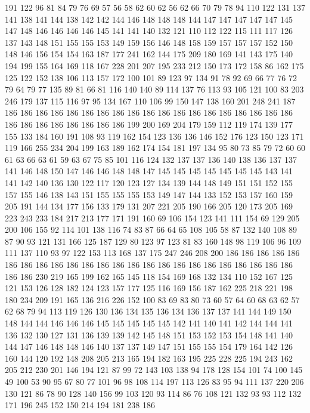 191 122 96 81 84 79 76 69 57 56 58 62 60 62 56 62 66 70 79 78
94 110 122 131 137 141 138 141 144 138 142 142 144 146 148 148 148 144 147 147
147 147 147 145 147 148 146 146 146 146 145 141 141 140 132 121 110 112 122 115
111 117 126 137 143 148 151 155 155 153 149 159 156 146 148 158 159 157 157 157
152 150 148 146 156 154 154 163 187 177 241 162 144 175 209 180 169 141 143 175
140 194 199 155 164 169 118 167 228 201 207 195 233 212 150 173 172 158 86 162
175 125 122 152 138 106 113 157 172 100 101 89 123 97 134 91 78 92 69 66
77 76 72 79 64 79 77 135 89 81 66 81 116 140 140 89 114 137 76 113
93 105 121 100 83 203 246 179 137 115 116 97 95 134 167 110 106 99 150 147
138 160 201 248 241 187 186 186 186 186 186 186 186 186 186 186 186 186 186 186
186 186 186 186 186 186 186 186 186 186 186 186 186 199 200 169 204 179 159 112
119 174 139 177 155 133 184 160 191 108 93 119 162 154 123 136 136 146 152 176
123 150 123 171 119 166 255 234 204 199 163 189 162 174 154 181 197 134 95 80
73 85 79 72 60 60 61 63 66 63 61 59 63 67 75 85 101 116 124 132
137 137 136 140 138 136 137 137 141 146 148 150 147 146 146 148 148 147 145 145
145 145 145 145 145 143 141 141 142 140 136 130 122 117 120 123 127 134 139 144
148 149 151 151 152 155 157 155 146 138 143 151 155 155 155 153 149 147 144 133
152 153 157 160 159 205 191 144 134 177 156 133 179 131 207 221 205 190 166 205
120 173 205 169 223 243 233 184 217 213 177 171 191 160 69 106 154 123 141 111
154 69 129 205 200 106 155 92 114 101 138 116 74 83 87 66 64 65 108 105
58 87 132 140 108 89 87 90 93 121 131 166 125 187 129 80 123 97 123 81
83 160 148 98 119 106 96 109 111 137 110 93 97 122 153 113 168 137 175 247
246 208 200 186 186 186 186 186 186 186 186 186 186 186 186 186 186 186 186 186
186 186 186 186 186 186 186 186 186 230 219 165 199 162 165 145 118 154 169 168
132 134 110 152 167 125 121 153 126 128 182 124 123 157 177 125 116 169 156 187
162 225 218 221 198 180 234 209 191 165 136 216 226 152 100 83 69 83 80 73
60 57 64 60 68 63 62 57 62 68 79 94 113 119 126 130 136 134 135 136
134 136 137 137 141 144 149 150 148 144 144 146 146 146 145 145 145 145 145 142
141 140 141 142 144 144 141 136 132 130 127 131 136 139 139 142 145 148 151 153
152 153 154 148 141 140 144 147 146 148 148 146 140 137 137 149 147 151 155 155
154 179 164 142 126 160 144 120 192 148 208 205 213 165 194 182 163 195 225 228
225 194 243 162 205 212 230 201 146 194 121 87 99 72 143 103 138 94 178 128
154 101 74 100 145 49 100 53 90 95 67 80 77 101 96 98 108 114 197 113
126 83 95 94 111 137 220 206 130 121 86 78 90 128 140 156 99 103 120 93
114 86 76 108 121 132 93 93 112 132 171 196 245 152 150 214 194 181 238 186
